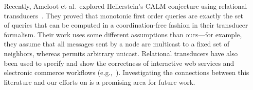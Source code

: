 Recently, Ameloot et al.\ explored Hellerstein's CALM conjecture using
relational transducers~\cite{relational-transducers}.  They proved that
monotonic first order queries are exactly the set of queries that can be
computed in a coordination-free fashion in their transducer formalism.  Their
work uses some different assumptions than ours---for example, they assume that
all messages sent by a node are multicast to a fixed set of neighbors, whereas
\lang permits arbitrary unicast. Relational transducers have also been used to
specify and show the correctness of interactive web services and electronic
commerce workflows
(e.g.,~\cite{trans-ecommerce,deutsch-icdt,deutsch-web-app}). Investigating the
connections between this literature and our efforts on \lang is a promising area
for future work.

